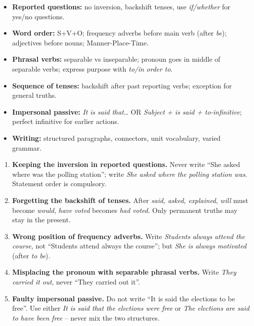 \documentclass[11pt]{article}
\begin{document}
\begin{aretenir}
\begin{itemize}
\item \textbf{Reported questions:} no inversion, backshift tenses, use \emph{if/whether} for yes/no questions.
\item \textbf{Word order:} S+V+O; frequency adverbs before main verb (after \emph{be}); adjectives before nouns; Manner-Place-Time.
\item \textbf{Phrasal verbs:} separable vs inseparable; pronoun goes in middle of separable verbs; express purpose with \emph{to/in order to}.
\item \textbf{Sequence of tenses:} backshift after past reporting verbs; exception for general truths.
\item \textbf{Impersonal passive:} \emph{It is said that\ldots} OR \emph{Subject + is said + to-infinitive}; perfect infinitive for earlier actions.
\item \textbf{Writing:} structured paragraphs, connectors, unit vocabulary, varied grammar.
\end{itemize}
\end{aretenir}

\begin{attention}
\begin{enumerate}
\item \textbf{Keeping the inversion in reported questions.} Never write ``She asked where was the polling station''; write \emph{She asked where the polling station was}. Statement order is compulsory.
\item \textbf{Forgetting the backshift of tenses.} After \emph{said, asked, explained}, \emph{will} must become \emph{would}, \emph{have voted} becomes \emph{had voted}. Only permanent truths may stay in the present.
\item \textbf{Wrong position of frequency adverbs.} Write \emph{Students always attend the course}, not ``Students attend always the course''; but \emph{She is always motivated} (after \emph{to be}).
\item \textbf{Misplacing the pronoun with separable phrasal verbs.} Write \emph{They carried it out}, never ``They carried out it''.
\item \textbf{Faulty impersonal passive.} Do not write ``It is said the elections to be free''. Use either \emph{It is said that the elections were free} or \emph{The elections are said to have been free} -- never mix the two structures.
\end{enumerate}
\end{attention}
\end{document}
